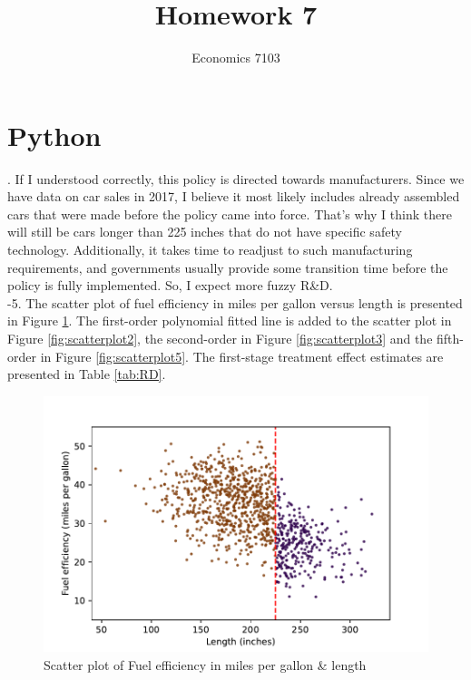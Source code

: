 \documentclass{article}
\title{Homework 7}
\author{Economics 7103}
\begin{document}
  
\maketitle

\section{Python}
. If I understood correctly, this policy is directed towards manufacturers. Since we have data on car sales in 2017, I believe it most likely includes already assembled cars that were made before the policy came into force. That's why I think there will still be cars longer than 225 inches that do not have specific safety technology. Additionally, it takes time to readjust to such manufacturing requirements, and governments usually provide some transition time before the policy is fully implemented. So, I expect more fuzzy R\&D.
\\

-5. The scatter plot of fuel efficiency in miles per gallon versus length is presented in Figure \ref{fig:scatterplot1}. The first-order polynomial fitted line is added to the scatter plot in Figure \ref{fig:scatterplot2}, the second-order in Figure \ref{fig:scatterplot3} and the fifth-order in Figure \ref{fig:scatterplot5}.  The first-stage treatment effect estimates are presented in Table \ref{tab:RD}. 

\begin{figure}[h!]
    \centering
    \includegraphics{homework 7/output/figure/scatterplot1.pdf}
    \caption{Scatter plot of Fuel efficiency in miles per gallon \& length}
    \label{fig:scatterplot1}
\end{figure}
\end{document}
